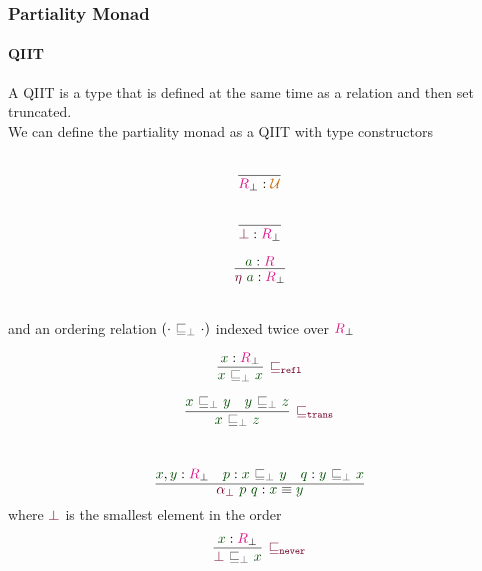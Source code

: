 \documentclass[xelatex,mathserif,serif,notheorems]{beamer} %
\theoremstyle{plain} %
\theoremstyle{definition}
\theoremstyle{remark}
\newcommand*{\term}[1]{\textcolor{green!30!black}{#1}} %
\newcommand*{\type}[1]{\textcolor{magenta!90!black}{#1}}
\newcommand*{\universe}[1]{\textcolor{orange!80!black}{#1}}
\newcommand*{\relation}[1]{\textcolor{gray!75!black}{\ensuremath{\mathtt{#1}}}}
\newcommand*{\constructor}[1]{\textcolor{purple!60!black}{\ensuremath{\mathtt{#1}}}}
\begin{document}
\begin{frame}
  \frametitle{Partiality Monad}
  \framesubtitle{QIIT}
  A QIIT is a type that is defined at the same time as a relation and then set truncated.
  \\[3mm]
  \pause
  We can define the partiality monad as a QIIT with type constructors\\[-4mm]
  \strut
  \hfill
  \begin{minipage}{0.25\linewidth}
    \begin{equation}
      \vcenter{\infer{\type{R}_\bot : \universe{\mathcal{U}}}{\strut}}
    \end{equation}
  \end{minipage}
  \hfill
  \begin{minipage}{0.25\linewidth}
    \begin{equation}
      \vcenter{\infer{\constructor{\bot} : \type{R}_\bot}{\strut}}
    \end{equation}
  \end{minipage}
  \hfill
  \begin{minipage}{0.25\linewidth}
    \begin{equation}
      \vcenter{\infer{\constructor{\eta}~\term{a} : \type{R}_\bot}{\term{a} : \type{R}}}
    \end{equation}
  \end{minipage}
  \hfill
  \strut
  \\[3mm]
  and an ordering relation \((\cdot~\relation{\sqsubseteq_{\bot}}~\cdot)\) indexed twice over \(\type{R}_\bot\) \\
  \strut
  \hfill
  \begin{minipage}{0.3\linewidth}
    \begin{equation}
      \vcenter{\infer[\constructor{\sqsubseteq_{refl}}]{\term{x}~\relation{\sqsubseteq_{\bot}}~\term{x}}{\term{x} : \type{R}_\bot}}
    \end{equation}
  \end{minipage}
  \hfill
  \begin{minipage}{0.45\linewidth}
    \begin{equation}
      \vcenter{\infer[\constructor{\sqsubseteq_{trans}}]{\term{x}~\relation{\sqsubseteq_{\bot}}~\term{z}}{\term{x}~\relation{\sqsubseteq_{\bot}}~\term{y} & \term{y}~\relation{\sqsubseteq_{\bot}}~\term{z}}}
    \end{equation}
  \end{minipage}
  \hfill
  \strut
  \\[4mm]
  \begin{equation}
    \vcenter{\infer{\constructor{\alpha_{\bot}}~\term{p}~\term{q} : \term{x} \equiv \term{y}}{\term{x},\term{y} : \type{R}_\bot & \term{p} : \term{x}~\relation{\sqsubseteq_{\bot}}~\term{y} & \term{q} : \term{y}~\relation{\sqsubseteq_{\bot}}~\term{x}}}
  \end{equation}
  where \(\constructor{\bot}\) is the smallest element in the order
  \begin{equation}
    \vcenter{\infer[\constructor{\sqsubseteq_{never}}]{\constructor{\bot}~\relation{\sqsubseteq_{\bot}}~\term{x}}{\term{x} : \type{R}_\bot}}
  \end{equation}
\end{frame}
\end{document}
